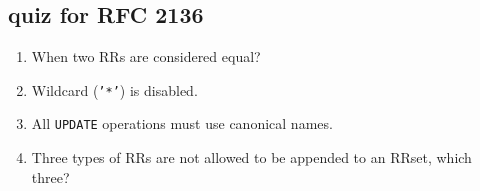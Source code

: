 \subsection{quiz for RFC 2136}

\begin{enumerate}
\item When two RRs are considered equal? \ans{}
\item Wildcard (\texttt{'*'}) is disabled. \tf{}
\item All \texttt{UPDATE} operations must use canonical names. \tf{}
\item Three types of RRs are not allowed to be appended to an RRset, which
  three?  \ans{}
\end{enumerate}